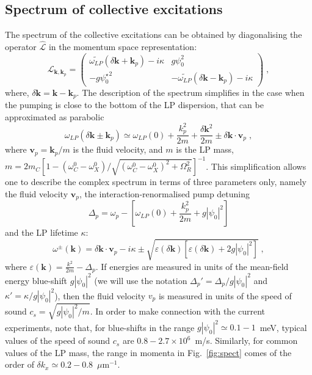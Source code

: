 \subsection{Spectrum of collective excitations}
\label{sec:spect}
%
The spectrum of the collective excitations can be obtained by
diagonalising the operator $\hat{\mathcal{L}}$ in the momentum space
representation:
%
\begin{equation}
  \mathcal{L}_{\bm{k},\bm{k}_p} = \begin{pmatrix}
    \widetilde{\omega_{LP}} (\delta \bm{k}+\bm{k}_p) - i \kappa &
    g \psi_0^2 \\ -g {\psi_0^{\star}}^2 & -
    \widetilde{\omega_{LP}}(\delta \bm{k}-\bm{k}_p) -
    i\kappa \end{pmatrix}\; ,
\label{eq:opell}
\end{equation}
%
where, $\delta \bm{k} = \bm{k} - \bm{k}_p$. The description of
the spectrum simplifies in the case when the pumping is close to the
bottom of the LP dispersion, that can be approximated as parabolic
%
\begin{equation}
  \omega_{LP} (\delta \bm{k} \pm \bm{k}_p) \simeq \omega_{LP}(0) +
  \frac{k_p^2}{2m} + \frac{\delta \bm{k}^2}{2m} \pm \delta \bm{k}
  \cdot \bm{v}_p \; ,
\end{equation}
%
where $\bm{v}_p=\bm{k}_p/m$ is the fluid velocity, and $m$ is the
LP mass, $m = 2m_C [1 - (\omega_C^0 - \omega_X^0)/\sqrt{(\omega_C^0 -
    \omega_X^0)^2 + \Omega_R^2}]^{-1}$. This simplification allows one
to describe the complex spectrum in terms of three parameters only,
namely the fluid velocity $\bm{v}_p$, the interaction-renormalised
pump detuning
%
\begin{equation}
  \Delta_p = \omega_p - \left[\omega_{LP} (0) +\frac{k_p^2}{2m} +
    g|\psi_0|^2\right]
\end{equation}
%
and the LP lifetime $\kappa$:
%
\begin{equation}
  \omega^{\pm} (\bm{k}) = \delta \bm{k}\cdot \bm{v}_p - i\kappa
  \pm \sqrt{\varepsilon(\delta \bm{k}) \left[\varepsilon(\delta
      \bm{k}) + 2g|\psi_0|^2\right]} \; ,
\label{eq:spect}
\end{equation}
%
where $\varepsilon(\bm{k}) = \frac{k^2}{2m} - \Delta_p$. If energies
are measured in units of the mean-field energy blue-shift $g
|\psi_0|^2$ (we will use the notation $\Delta_p' =
\Delta_p/g|\psi_0|^2$ and $\kappa'= \kappa/g|\psi_0|^2$), then the
fluid velocity $v_p$ is measured in units of the speed of sound $c_s =
\sqrt{g|\psi_0|^2/m}$. In order to make connection with the current
experiments, note that, for blue-shifts in the range $g |\psi_0|^2
\simeq 0.1-1$~meV, typical values of the speed of sound $c_s$ are
$0.8-2.7\times 10^6$~m/s. Similarly, for common values of the LP mass,
the range in momenta in Fig.~\ref{fig:spect} comes of the order of
$\delta k_x \simeq 0.2-0.8$~$\mu$m${}^{-1}$.

